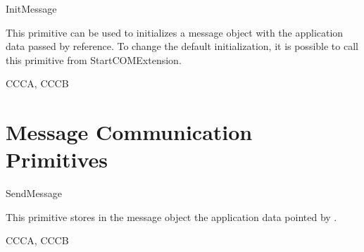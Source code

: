 \begin{function}{InitMessage}
  \begin{fundescription}
    This primitive can be used to initializes a message object with the application data
    passed by reference. To change the default initialization, it is possible 
    to call this primitive from StartCOMExtension.
  \end{fundescription}
  \begin{funparameters}
  \end{funparameters}
  \begin{funreturn}
  \end{funreturn}
  \begin{funconformance}
    CCCA, CCCB
  \end{funconformance}
\end{function}

\pagebreak


\section{Message Communication Primitives}

\begin{function}{SendMessage}
  \begin{fundescription}
    This primitive stores in the message object  the application data
    pointed by .
  \end{fundescription}
  \begin{funparameters}
  \end{funparameters}
  \begin{funreturn}
  \end{funreturn}
  \begin{funconformance}
    CCCA, CCCB
  \end{funconformance}
\end{function}


